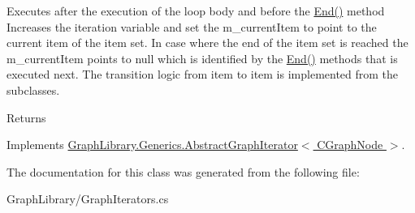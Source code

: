 Executes after the execution of the loop body and before the \hyperlink{class_graph_library_1_1_c_it___graph_d_f_s_a6f6992493bc70c2e551c5d46bf9bf998}{End()} method Increases the iteration variable and set the m\+\_\+current\+Item to point to the current item of the item set. In case where the end of the item set is reached the m\+\_\+current\+Item points to null which is identified by the \hyperlink{class_graph_library_1_1_c_it___graph_d_f_s_a6f6992493bc70c2e551c5d46bf9bf998}{End()} methods that is executed next. The transition logic from item to item is implemented from the subclasses. 

\begin{DoxyReturn}{Returns}

\end{DoxyReturn}


Implements \hyperlink{class_graph_library_1_1_generics_1_1_abstract_graph_iterator_aac8cffd0d579708a94ba056e4f4a00b2}{Graph\+Library.\+Generics.\+Abstract\+Graph\+Iterator$<$ C\+Graph\+Node $>$}.



The documentation for this class was generated from the following file\+:\begin{DoxyCompactItemize}
\item 
Graph\+Library/Graph\+Iterators.\+cs\end{DoxyCompactItemize}
